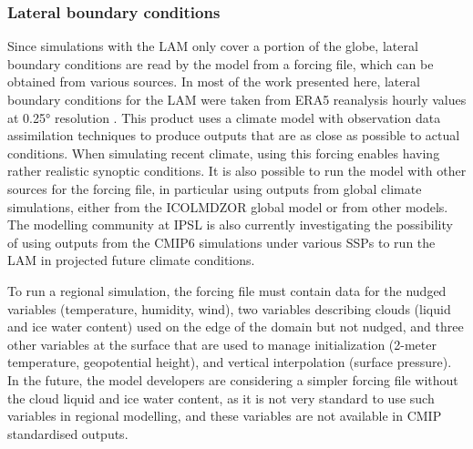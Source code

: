 \subsubsection{Lateral boundary conditions}
Since simulations with the LAM only cover a portion of the globe, lateral boundary conditions are read by the model from a forcing file, which can be obtained from various sources. 
In most of the work presented here, lateral boundary conditions for the LAM were taken from ERA5 reanalysis hourly values at 0.25° resolution \citep{hersbach_era5_2020}. This product uses a climate model with observation data assimilation techniques to produce outputs that are as close as possible to actual conditions. When simulating recent climate, using this forcing enables having rather realistic synoptic conditions. 
It is also possible to run the model with other sources for the forcing file, in particular using outputs from global climate simulations, either from the ICOLMDZOR global model or from other models. The modelling community at IPSL is also currently investigating the possibility of using outputs from the CMIP6 simulations under various SSPs to run the LAM in projected future climate conditions.

To run a regional simulation, the forcing file must contain data for the nudged variables (temperature, humidity, wind), two variables describing clouds (liquid and ice water content) used on the edge of the domain but not nudged, and three other variables at the surface that are used to manage initialization (2-meter temperature, geopotential height), and vertical interpolation (surface pressure). In the future, the model developers are considering a simpler forcing file without the cloud liquid and ice water content, as it is not very standard to use such variables in regional modelling, and these variables are not available in CMIP standardised outputs. 

